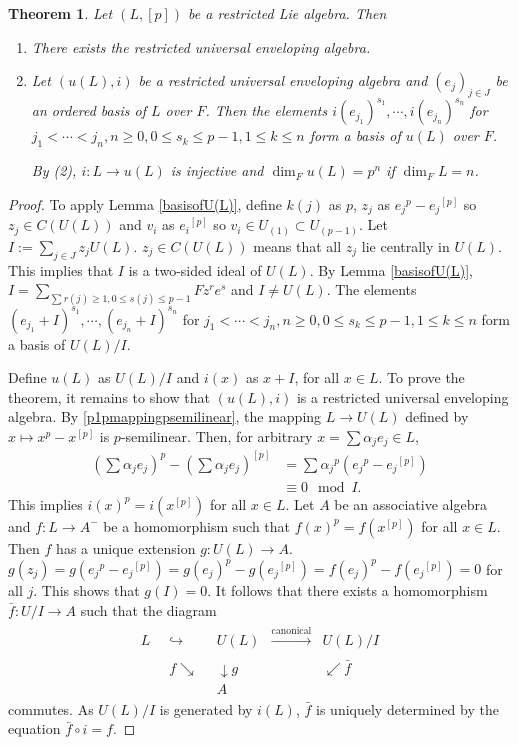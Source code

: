 \documentclass[12pt,MSc]{muthesis_2023}
\theoremstyle{plain}%
\newtheorem{Theorem}[FactCounter]{Theorem} %
\theoremstyle{definition}
\theoremstyle{remark}
\begin{document}
\begin{Theorem}
Let $(L, [p])$ be a restricted Lie algebra. Then
\begin{enumerate}
\item[(1)]
There exists the restricted universal enveloping algebra.

\item[(2)]
Let $(u(L), i)$ be a restricted universal enveloping algebra and $(e_j)_{j\in J}$ be an ordered basis of $L$ over $F$. Then the elements $i(e_{j_1})^{s_1}, \cdots, i(e_{j_n})^{s_n}$ for $j_1 < \cdots < j_n, n\geq 0, 0 \leq s_k \leq p-1, 1\leq k \leq n$ form a basis of $u(L)$ over $F$.

By (2), $i:L\rightarrow u(L)$ is injective and $\dim_F u(L)=p^n$ if $\dim_FL=n$.
\end{enumerate}

\end{Theorem}

\begin{proof}
To apply Lemma \ref{basisofU(L)}, define $k(j)$ as $p$, $z_j$ as ${e_j}^p-{e_j}^{[p]}$ so $z_j \in C(U(L))$ and $v_i$ as ${e_i}^{[p]}$ so $v_i \in U_{(1)} \subset U_{(p-1)}$. Let $I := \sum_{j\in J}z_jU(L)$. $z_j \in C(U(L))$ means that all $z_j$ lie centrally in $U(L)$. This implies that $I$ is a two-sided ideal of $U(L)$. By Lemma \ref{basisofU(L)}, $I=\sum_{\sum r(j) \geq 1, 0\leq s(j)\leq p-1} Fz^re^s$ and $I \neq U(L)$. The elements $(e_{j_1}+I)^{s_1},\cdots, (e_{j_n}+I)^{s_n}$ for $j_1<\cdots<j_n, n\geq 0, 0 \leq s_k\leq p-1, 1\leq k\leq n$ form a basis of $U(L)/I$.

Define $u(L)$ as $U(L)/I$ and $i(x)$ as $x+I$, for all $x\in L$. To prove the theorem, it remains to show that $(u(L), i)$ is a restricted universal enveloping algebra. By \ref{p1pmappingpsemilinear}, the mapping $L\rightarrow U(L)$ defined by $x \mapsto x^p-x^{[p]}$ is $p$-semilinear. Then, for arbitrary $x=\sum \alpha_je_j\in L$,
\begin{align*}
(\sum \alpha_je_j)^p-(\sum\alpha_je_j)^{[p]}&=\sum {\alpha_j}^p({e_j}^p-{e_j}^{[p]})\\
&\equiv 0 \mod I.
\end{align*}
This implies $i(x)^p=i(x^{[p]})$ for all $x\in L$. Let $A$ be an associative algebra and $f:L\rightarrow A^-$ be a homomorphism such that $f(x)^p=f(x^{[p]})$ for all $x\in L$. Then $f$ has a unique extension $g:U(L)\rightarrow A$. $g(z_j)=g({e_j}^p-{e_j}^{[p]})=g(e_j)^p-g({e_j}^{[p]})=f(e_j)^p-f({e_j}^{[p]})=0$ for all $j$. This shows that $g(I)=0$. It follows that there exists a homomorphism $\bar{f}: U/I \rightarrow A$ such that the diagram
\begin{align*}
\begin{matrix}
L \;\;& \hookrightarrow \;\;& U(L) &\xrightarrow[]{\text{canonical}} & U(L)/I\\
  \;\;& f \searrow\;\; & \downarrow g & & \swarrow \bar{f}\\
  \;\;& \;\;& A & & 
\end{matrix}
\end{align*}
commutes. As $U(L)/I$ is generated by $i(L)$, $\bar{f}$ is uniquely determined by the equation $\bar{f}\circ i =f $.
\end{proof}
\end{document}
